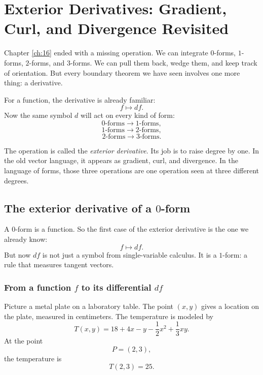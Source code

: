 
\chapter{Exterior Derivatives: Gradient, Curl, and Divergence Revisited}
\label{ch:17}

Chapter \ref{ch:16} ended with a missing operation.  We can integrate \(0\)-forms,
\(1\)-forms, \(2\)-forms, and \(3\)-forms.  We can pull them back, wedge them, and
keep track of orientation.  But every boundary theorem we have seen involves one more
thing: a derivative.

For a function, the derivative is already familiar:
\[
    f \longmapsto df.
\]
Now the same symbol \(d\) will act on every kind of form:
\[
    0\text{-forms}\longrightarrow 1\text{-forms},
\]
\[
    1\text{-forms}\longrightarrow 2\text{-forms},
\]
\[
    2\text{-forms}\longrightarrow 3\text{-forms}.
\]

The operation is called the \emph{exterior derivative}.  Its job is to raise degree by
one.  In the old vector language, it appears as gradient, curl, and divergence.  In the
language of forms, those three operations are one operation seen at three different
degrees.

\section{The exterior derivative of a \texorpdfstring{\(0\)}{0}-form}
\label{sec:17.1}

A \(0\)-form is a function.  So the first case of the exterior derivative is the one we
already know:
\[
    f \longmapsto df.
\]
But now \(df\) is not just a symbol from single-variable calculus.  It is a \(1\)-form:
a rule that measures tangent vectors.

\subsection{From a function \texorpdfstring{\(f\)}{f} to its differential
\texorpdfstring{\(df\)}{df}}

Picture a metal plate on a laboratory table.  The point \((x,y)\) gives a location on the
plate, measured in centimeters.  The temperature is modeled by
\[
    T(x,y)=18+4x-y-\frac12x^2+\frac13xy.
\]
At the point
\[
    P=(2,3),
\]
the temperature is
\[
    T(2,3)=25.
\]

